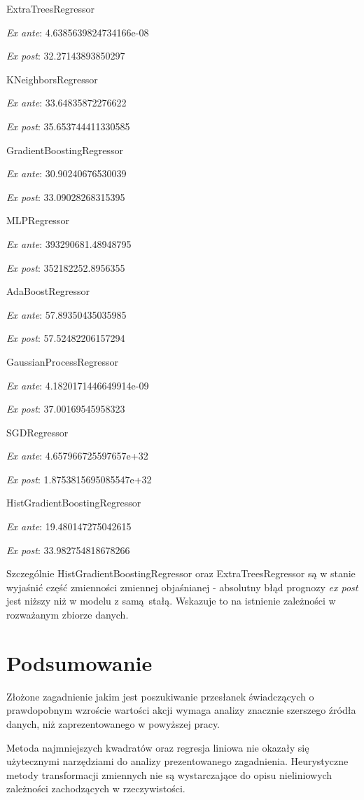 \documentclass{article}
\begin{document}
ExtraTreesRegressor

\textit{Ex ante}:
4.6385639824734166e-08

\textit{Ex post}:
32.27143893850297

KNeighborsRegressor

\textit{Ex ante}:
33.64835872276622

\textit{Ex post}:
35.653744411330585

GradientBoostingRegressor

\textit{Ex ante}:
30.90240676530039

\textit{Ex post}:
33.09028268315395

MLPRegressor

\textit{Ex ante}:
393290681.48948795

\textit{Ex post}:
352182252.8956355

AdaBoostRegressor

\textit{Ex ante}:
57.89350435035985

\textit{Ex post}:
57.52482206157294

GaussianProcessRegressor

\textit{Ex ante}:
4.1820171446649914e-09

\textit{Ex post}:
37.00169545958323

SGDRegressor

\textit{Ex ante}:
4.657966725597657e+32

\textit{Ex post}:
1.8753815695085547e+32

HistGradientBoostingRegressor

\textit{Ex ante}:
19.480147275042615

\textit{Ex post}:
33.982754818678266



Szczególnie HistGradientBoostingRegressor oraz ExtraTreesRegressor są w stanie wyjaśnić część zmienności zmiennej objaśnianej - absolutny błąd prognozy \textit{ex post} jest niższy niż w modelu z samą stałą. Wskazuje to na istnienie zależności w rozważanym zbiorze danych.

\newpage
\section{Podsumowanie}
Złożone zagadnienie jakim jest poszukiwanie przesłanek świadczących o prawdopobnym wzroście wartości akcji wymaga analizy znacznie szerszego źródła danych, niż zaprezentowanego w powyższej pracy. 

Metoda najmniejszych kwadratów oraz regresja liniowa nie okazały się użytecznymi narzędziami do analizy prezentowanego zagadnienia. Heurystyczne metody transformacji zmiennych nie są wystarczające do opisu nieliniowych zależności zachodzących w rzeczywistości.
\end{document}
